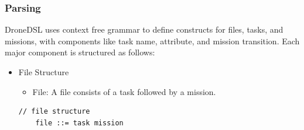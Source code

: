 \subsubsection{Parsing}
DroneDSL uses context free grammar to define constructs for files, tasks, and missions, with components like task name, attribute, and mission transition. Each major component is structured as follows:
\begin{itemize}
    \item File Structure
    \begin{itemize}
        \item File: A file consists of a task followed by a mission.
    \end{itemize}
    \begin{lstlisting}[style=customgo]
    // file structure
    file ::= task mission
    \end{lstlisting}
    

\end{itemize}
